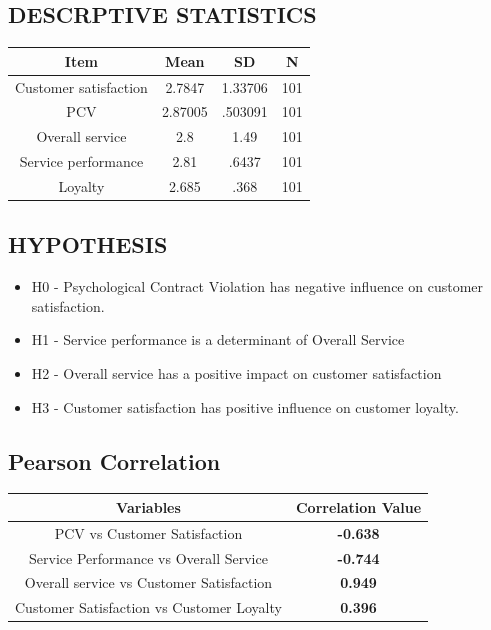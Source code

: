 \documentclass[a4paper, 14pt]{article}
\begin{document}
{\subsection*{DESCRPTIVE STATISTICS}
\begin{center}
\begin{tabular}{|c|c|c|c|}
\hline
Item & \textbf{Mean} & \textbf{SD} & N \\
\hline
Customer satisfaction & 2.7847 & 1.33706 & 101 \\
PCV & 2.87005 & .503091 & 101 \\
Overall service & 2.8 & 1.49 & 101 \\
Service performance & 2.81 & .6437 & 101 \\
Loyalty & 2.685 & .368 & 101 \\
\hline
\end{tabular}
\end{center}

\subsection*{HYPOTHESIS}
\begin{itemize}
\item H0 - Psychological Contract Violation has negative influence on customer satisfaction.
\item H1 - Service performance is a determinant of Overall Service
\item H2 - Overall service has a positive impact on customer satisfaction
\item H3 - Customer satisfaction has positive influence on customer loyalty.
\end{itemize}

\subsection*{Pearson Correlation}
\begin{center}
\begin{tabular}{|c|c|}
\hline
Variables & Correlation Value \\
\hline
PCV vs Customer Satisfaction & \textbf{-0.638} \\
Service Performance vs Overall Service & \textbf{-0.744} \\
Overall service vs Customer Satisfaction & \textbf{0.949} \\
Customer Satisfaction vs Customer Loyalty & \textbf{0.396} \\
\hline
\end{tabular}
\end{center}

}
\end{document}
